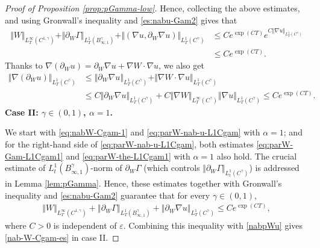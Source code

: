 \documentclass[reqno,11pt,a4paper]{amsart}
\begin{document}
\begin{proof}[Proof of Proposition \ref{prop:pGamma-low}]
Hence, collecting the above estimates, and using Gronwall's inequality and \eqref{es:nabu-Gam2} gives that
\begin{equation}\label{nab-W-Cgam-es1}
\begin{split}
  \Vert W\Vert _{L^\infty_T(C^{1,\gamma})} + \Vert \partial_W \Gamma\Vert _{L^1_T(B^\gamma_{\infty,1})}  
  + \Vert (\nabla u, \partial_W \nabla u)\Vert _{L^1_T (C^\gamma)} 
  & \leq C e^{\exp (CT)} e^{C \Vert \nabla u\Vert _{L^1_T(C^\gamma)}} \\
  & \leq C e^{\exp(CT)}.
\end{split}
\end{equation}
Thanks to $\nabla (\partial_Wu)=\partial_W\nabla u + \nabla W\cdot\nabla u$, we also get 
\begin{equation}\label{nabpWu}
\begin{aligned}
  \Vert \nabla (\partial_W u)\Vert _{L^1_T (C^\gamma)} 
  & \leq \Vert \partial_W\nabla u \Vert _{L^1_T (C^\gamma)}
  + \Vert \nabla W\cdot\nabla u\Vert _{L^1_T (C^\gamma)} \\
  & \leq C\Vert \partial_W\nabla u \Vert _{L^1_T (C^\gamma)} 
  + C\Vert \nabla W\Vert _{L^\infty_T (C^\gamma)}\Vert \nabla u\Vert _{L^1_T (C^\gamma)} 
  \leq Ce^{\exp (CT)}.
\end{aligned}
\end{equation}
\vskip1mm
\textbf{Case II: $\gamma\in (0,1)$, $\alpha=1$.}
\vskip1mm

We start with \eqref{eq:nabW-Cgam-1} and \eqref{eq:parW-nab-u-L1Cgam} with $\alpha=1$;
and for the right-hand side of \eqref{eq:parW-nab-u-L1Cgam}, both estimates \eqref{eq:parW-Gam-L1Cgam1}
and \eqref{eq:parW-the-L1Cgam1} with $\alpha=1$ also hold. 
The crucial estimate of $L^1_t(B^\gamma_{\infty,1})$-norm of 
$\partial_W \Gamma$ (which controls $\Vert \partial_W\Gamma\Vert _{L^1_t(C^\gamma)}$) is addressed in Lemma \ref{lem:pGamma}.
Hence, these estimates together with Gronwall's inequality and 
\eqref{es:nabu-Gam2} guarantee that for every $\gamma\in (0,1)$,
\begin{align*}%
  \Vert W\Vert _{L_T^{\infty}\left(C^{1,\gamma}\right)}
  +\left\Vert \partial_W \Gamma\right\Vert _{L_T^1\left(B^\gamma_{\infty,1}\right)}
  +\left\Vert \partial_W \nabla u\right\Vert _{L_T^1\left(C^\gamma\right)} \leq C e^{\exp(CT)},
  \end{align*}
where $C>0$ is independent of $\varepsilon$. 
Combining this inequality with \eqref{nabpWu} gives \eqref{nab-W-Cgam-es} in case II.
\end{proof}
\end{document}
